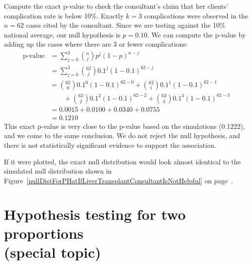 \begin{example}{Compute the exact p-value to check the consultant's claim that her clients' complication rate is below 10\%.}
Exactly $k=3$ complications were observed in the $n=62$ cases cited by the consultant. Since we are testing against the 10\% national average, our null hypothesis is $p=0.10$. We can compute the p-value by adding up the cases where there are 3 or fewer complications:
\begin{align*}
\text{p-value}
	&= \sum_{j=0}^{3} {n\choose j} p^{j}(1-p)^{n-j} \\
	&= \sum_{j=0}^{3} {62\choose j} 0.1^{j}(1-0.1)^{62-j} \\
	&= {62\choose 0} 0.1^{0}(1-0.1)^{62-0} +
		{62\choose 1} 0.1^{1}(1-0.1)^{62-1} \\
	& \qquad + {62\choose 2} 0.1^{2}(1-0.1)^{62-2} +
		{62\choose 3} 0.1^{3}(1-0.1)^{62-3} \\
	&= 0.0015 + 0.0100 + 0.0340 + 0.0755 \\
	&= 0.1210
\end{align*}
This exact p-value is very close to the p-value based on the simulations (0.1222), and we come to the same conclusion. We do not reject the null hypothesis, and there is not statistically significant evidence to support the association.

If it were plotted, the exact null distribution would look almost identical to the simulated null distribution shown in Figure~\ref{nullDistForPHatIfLiverTransplantConsultantIsNotHelpful} on page~\pageref{nullDistForPHatIfLiverTransplantConsultantIsNotHelpful}.
\end{example}


\section[Hypothesis testing for two proportions (special topic)]{Hypothesis testing for two proportions \\ (special topic)}
\label{smallSampleHTForTwoOrMoreProportion}

